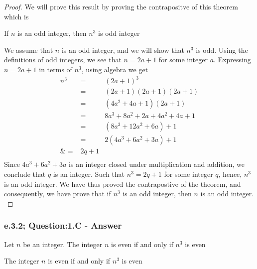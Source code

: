 \begin{proof}
We will prove this result by proving the contrapositve of this theorem which is
	\begin{center}
		If $n$ is an odd integer, then $n^3$ is odd integer
	\end{center}

We assume that $n$ is an odd integer, and we will show that $n^3$ is odd. Using the definitions of odd integers, we see that $n = 2a + 1$ for some integer $a$. Expressing $n = 2a + 1$ in terms of $n^3$, using algebra we get
	\begin{eqnarray*}
		n^3 & = & (2a + 1)^3  \nonumber \\
		& = & (2a + 1)(2a + 1)(2a + 1) \nonumber \\
		& = & (4a^2 + 4a + 1)(2a + 1) \nonumber \\		
		& = & 8a^3 + 8a^2 + 2a + 4a^2 + 4a + 1 \nonumber \\			
		& = & (8a^3 + 12a^2 + 6a) + 1 \nonumber \\
		& = & 2(4a^3 + 6a^2 + 3a) + 1 \nonumber \\
		\& = & 2q + 1 \nonumber \\
	\end{eqnarray*}
Since $4a^3 + 6a^2 + 3a$ is an integer closed under multiplication and addition, we conclude that $q$ is an integer. Such that $n^3 = 2q + 1$ for some integer $q$, hence, $n^3$ is an odd integer. We have thus proved the contrapostive of the theorem, and consequently, we have prove that if $n^3$ is an odd integer, then $n$ is an odd integer. \\
\end{proof}








\subsubsection*{e.3.2; Question:1.C - Answer}
Let $n$ be an integer. The integer $n$ is even if and only if $n^3$ is even

\begin{tcolorbox}
	\begin{theorem}
		The integer $n$ is even if and only if $n^3$ is even
	\end{theorem}
\end{tcolorbox}

